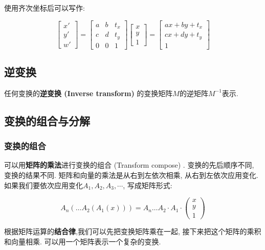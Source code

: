 \documentclass[openany]{progbookcn}
\begin{document}
使用齐次坐标后可以写作: 

\begin{equation}
	\begin{bmatrix}x'\\y'\\w'\end{bmatrix}=\begin{bmatrix}a&b&t_x\\c&d&t_y\\0&0&1\end{bmatrix}\begin{bmatrix}x\\y\\1\end{bmatrix}=\begin{bmatrix}ax+by+t_x\\cx+dy+t_y\\1\end{bmatrix}
\end{equation}

\subsection{逆变换}

任何变换的\textbf{逆变换 (Inverse transform) }的变换矩阵$M$的逆矩阵$M^{-1}$表示. 

\subsection{变换的组合与分解}

\subsubsection{变换的组合}

可以用\textbf{矩阵的乘法}进行变换的组合 (Transform compose) . 变换的先后顺序不同, 变换的结果不同. 矩阵和向量的乘法是从右到左依次相乘, 从右到左依次应用变化. 如果我们要依次应用变化$A_1,A_2,A_3,\cdots$, 写成矩阵形式: 

\begin{equation}
	A_n(\dots A_2(A_1(x)))=A_n\dots A_2\cdot A_1\cdot \begin{pmatrix}x\\y\\1\end{pmatrix}
\end{equation}

根据矩阵运算的\textbf{结合律},我们可以先把变换矩阵乘在一起, 接下来把这个矩阵的乘积和向量相乘. 可以用一个矩阵表示一个复杂的变换. 
\end{document}
